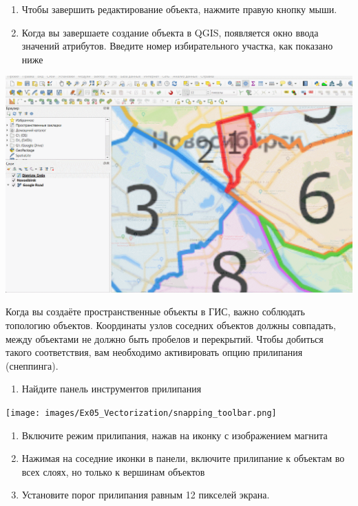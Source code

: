 \documentclass[
  12pt,
]{book}
\providecommand{\tightlist}{%
  \setlength{\itemsep}{0pt}\setlength{\parskip}{0pt}}
\begin{document}
\begin{enumerate}
\def\labelenumi{\arabic{enumi}.}
\setcounter{enumi}{4}
\item
  Чтобы завершить редактирование объекта, нажмите правую кнопку мыши.
\item
  Когда вы завершаете создание объекта в QGIS, появляется окно ввода значений атрибутов. Введите номер избирательного участка, как показано ниже
\end{enumerate}

\includegraphics{images/Ex05_Vectorization/new_attribute.gif}

Когда вы создаёте пространственные объекты в ГИС, важно соблюдать топологию объектов. Координаты узлов соседних объектов должны совпадать, между объектами не должно быть пробелов и перекрытий. Чтобы добиться такого соответствия, вам необходимо активировать опцию прилипания (снеппинга).

\begin{enumerate}
\def\labelenumi{\arabic{enumi}.}
\setcounter{enumi}{6}
\tightlist
\item
  Найдите панель инструментов прилипания
\end{enumerate}

\texttt{[image: images/Ex05\_Vectorization/snapping\_toolbar.png]}

\begin{enumerate}
\def\labelenumi{\arabic{enumi}.}
\setcounter{enumi}{7}
\item
  Включите режим прилипания, нажав на иконку с изображением магнита
\item
  Нажимая на соседние иконки в панели, включите прилипание к объектам во всех слоях, но только к вершинам объектов
\item
  Установите порог прилипания равным 12 пикселей экрана.
\end{enumerate}
\end{document}
